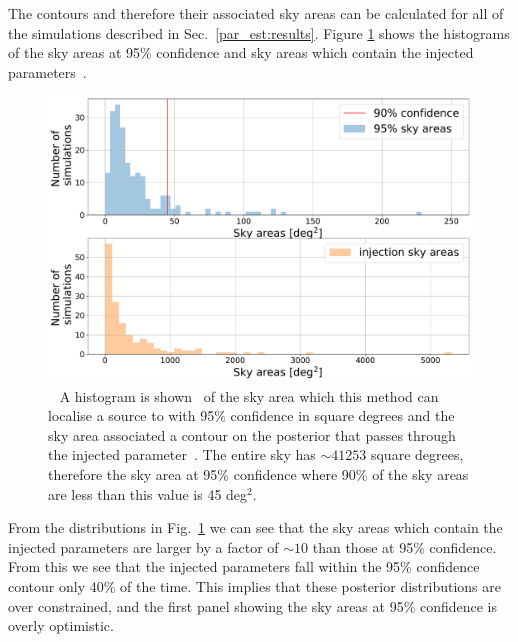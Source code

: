 The contours and therefore their associated sky areas can be calculated for all
of the simulations described in Sec.~\ref{par_est:results}. Figure
\ref{par_est:results:sky_area} shows the histograms of the sky areas at 95\%
confidence and sky areas which contain the injected parameters~.
%
\begin{figure}[ht]
    \centering
    \includegraphics[width=\linewidth]{C5_parameter/sky_area_hist.pdf}
    \caption[p-p plot for the CW simulations]{~ A histogram is shown~ of the sky area
which this method can localise a source to with 95\% confidence in square
degrees and the sky area associated a contour on the posterior that passes
through the injected parameter~. The
entire sky has $\sim 41253$ square degrees, therefore the sky area at 95\%
confidence where 90\% of the sky areas are less than this value is 45
deg$^2$.~}
\label{par_est:results:sky_area} 
\end{figure}
%
From the distributions in Fig.~\ref{par_est:results:sky_area} we can see that
the sky areas which contain the injected parameters are larger by a factor of
$\sim 10$ than those at 95\% confidence.  From this we see that the injected
parameters fall within the 95\% confidence contour only 40\% of the time.  This
implies that these posterior distributions are over constrained, and the first
panel showing the sky areas at 95\% confidence is overly optimistic.~

